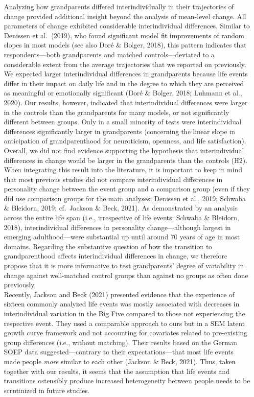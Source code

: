 \documentclass[
  english,
  man,floatsintext]{apa7}
\begin{document}
Analyzing how grandparents differed interindividually in their trajectories of change provided additional insight beyond the analysis of mean-level change. All parameters of change exhibited considerable interindividual differences. Similar to Denissen et al.~(2019), who found significant model fit improvements of random slopes in most models (see also Doré \& Bolger, 2018), this pattern indicates that respondents---both grandparents and matched controls---deviated to a considerable extent from the average trajectories that we reported on previously.\\
We expected larger interindividual differences in grandparents because life events differ in their impact on daily life and in the degree to which they are perceived as meaningful or emotionally significant (Doré \& Bolger, 2018; Luhmann et al., 2020). Our results, however, indicated that interindividual differences were larger in the controls than the grandparents for many models, or not significantly different between groups. Only in a small minority of tests were interindividual differences significantly larger in grandparents (concerning the linear slope in anticipation of grandparenthood for neuroticism, openness, and life satisfaction). Overall, we did not find evidence supporting the hypothesis that interindividual differences in change would be larger in the grandparents than the controls (H2).\\
When integrating this result into the literature, it is important to keep in mind that most previous studies did not compare interindividual differences in personality change between the event group and a comparison group (even if they did use comparison groups for the main analyses; Denissen et al., 2019; Schwaba \& Bleidorn, 2019; cf.~Jackson \& Beck, 2021). As demonstrated by an analysis across the entire life span (i.e., irrespective of life events; Schwaba \& Bleidorn, 2018), interindividual differences in personality change---although largest in emerging adulthood---were substantial up until around 70 years of age in most domains. Regarding the substantive question of how the transition to grandparenthood affects interindividual differences in change, we therefore propose that it is more informative to test grandparents' degree of variability in change against well-matched control groups than against no groups as often done previously.\\
Recently, Jackson and Beck (2021) presented evidence that the experience of sixteen commonly analyzed life events was mostly associated with decreases in interindividual variation in the Big Five compared to those not experiencing the respective event. They used a comparable approach to ours but in a SEM latent growth curve framework and not accounting for covariates related to pre-existing group differences (i.e., without matching). Their results based on the German SOEP data suggested---contrary to their expectations---that most life events made people \emph{more} similar to each other (Jackson \& Beck, 2021). Thus, taken together with our results, it seems that the assumption that life events and transitions ostensibly produce increased heterogeneity between people needs to be scrutinized in future studies.
\end{document}
